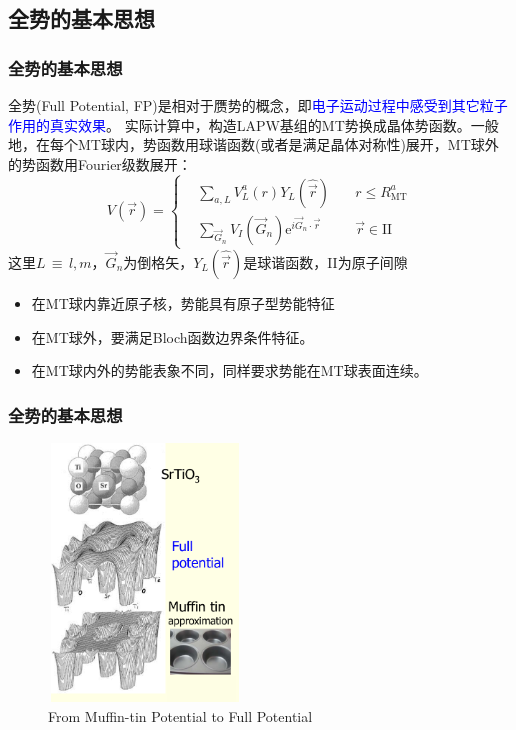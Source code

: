 {\subsection{全势的基本思想}
\frame
{
\frametitle{全势的基本思想}
全势\textrm{(Full Potential, FP)}是相对于赝势的概念，即\textcolor{blue}{电子运动过程中感受到其它粒子作用的真实效果}。
实际计算中，构造\textrm{LAPW}基组的\textrm{MT}势换成晶体势函数。一般地，在每个\textrm{MT}球内，势函数用球谐函数(或者是满足晶体对称性)展开，\textrm{MT}球外的势函数用\textrm{Fourier}级数展开：%
{\footnotesize$$ V(\vec r)=\left\{
  \begin{aligned}
    &\sum_{a,L}V_L^a(r)Y_L(\hat{\vec r})\quad &r\leqslant R_{\mathrm{MT}}^a\\
    &\sum_{\vec G_n}V_I(\vec G_n)\textrm{e}^{i\vec G_n\cdot\vec r} &\vec r\in\mathrm{II}
  \end{aligned}\right.
  \label{eq:solid-63}
$$}
这里$L$\,$\equiv$\,$l,m$，$\vec G_n$为倒格矢，$Y_L(\hat{\vec r})$是球谐函数，\textrm{II}为原子间隙
\begin{itemize}
	\item 在\textrm{MT}球内靠近原子核，势能具有原子型势能特征
	\item 在\textrm{MT}球外，要满足\textrm{Bloch}函数边界条件特征。
	\item 在\textrm{MT}球内外的势能表象不同，同样要求势能在\textrm{MT}球表面连续。
\end{itemize}
}

\frame
{
\frametitle{全势的基本思想}
\vspace*{-13pt}
\begin{figure}[h!]
\centering
\includegraphics[height=2.70in,width=2.02in,viewport=1 22 507 715,clip]{Figures/MT_FP.png}
\caption{\tiny \textrm{From Muffin-tin Potential to Full Potential}}%
\label{Muffin_tin_FP}
\end{figure}
}

}
